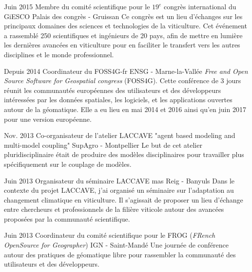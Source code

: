 \documentclass[]{cv-etienne}
\begin{document}
\begin{entrylist}
\entry
{Juin 2015}
{Membre du comité scientifique pour le $19^{e}$ congrès international du GiESCO}
{Palais des congrès - Gruissan}
{Ce congrès est un lieu d'échanges sur les principaux domaines des sciences et technologies de la viticulture. Cet événement a rassemblé 250 scientifiques et ingénieurs de 20 pays, afin de mettre en lumière les dernières avancées en viticulture pour en faciliter le transfert vers les autres disciplines et le monde professionnel.}
\end{entrylist}
\begin{entrylist}
\entry
{Depuis 2014}
{Coordinateur du FOSS4G-fr}
{ENSG - Marne-la-Vallée}
{\emph{Free and Open Source Software for Geospatial congress} (FOSS4G). Cette conférence de 3 jours réunit les communautés européennes des utilisateurs et des développeurs intéressées par les données spatiales, les logiciels, et les applications ouvertes autour de la géomatique. Elle a eu lieu en mai 2014 et 2016 ainsi qu'en juin 2017 pour une version européenne.}
\end{entrylist}
\begin{entrylist}
\entry
{Nov. 2013}
{Co-organisateur de l'atelier LACCAVE "agent based modeling and  multi-model coupling"}
{SupAgro - Montpellier}
{Le but de cet atelier pluridisciplinaire était de produire des modèles disciplinaires pour travailler plus spécifiquement sur le couplage de modèles.}
\end{entrylist}
\begin{entrylist}
\entry
{Juin 2013}
{Organisateur du séminaire LACCAVE}
{mas Reig - Banyuls}
{Dans le contexte du projet LACCAVE, j'ai organisé un séminaire sur l'adaptation au changement climatique en viticulture. Il s'agissait de proposer un lieu d'échange entre chercheurs et professionnels de la filière viticole autour des avancées proposées par la communauté scientifique.}
\end{entrylist}
\begin{entrylist}
\entry
{Juin 2013}
{Coordinateur du comité scientifique pour le FROG  (\emph{FRench OpenSource for Geographer})}
{IGN - Saint-Mandé}
{Une journée de conférence autour des pratiques de géomatique libre pour rassembler la communauté des utilisateurs et des développeurs.}
\end{entrylist}
\vspace{15ex}
\end{document}
